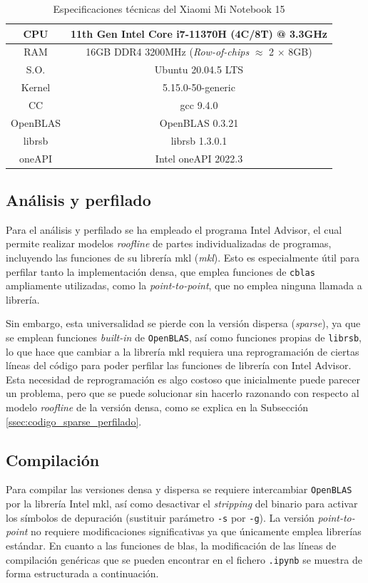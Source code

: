 \begin{table}[htpb]
\centering
\begin{tabular}{|c|c|}
    \hline
    CPU & 11th Gen Intel Core i7-11370H (4C/8T) @ 3.3GHz\\\hline
    RAM & 16GB DDR4 3200MHz (\textit{Row-of-chips} {\small$\approx$} 2 $\times$ 8GB)\\\hline
    S.O. & Ubuntu 20.04.5 LTS\\\hline
    Kernel & 5.15.0-50-generic \\\hline
    CC & gcc 9.4.0\\\hline
    OpenBLAS & OpenBLAS 0.3.21\\\hline
    librsb & librsb 1.3.0.1\\\hline
    oneAPI & Intel oneAPI 2022.3\\\hline
\end{tabular}
\caption{\label{tb:especificaciones_xiaomi}Especificaciones técnicas del Xiaomi Mi Notebook 15}
\end{table}

\subsection{Análisis y perfilado}
\label{ssec:analisis_perfilado_metodologia}
Para el análisis y perfilado se ha empleado el programa Intel Advisor, el cual permite realizar modelos \textit{roofline} de partes individualizadas de programas, incluyendo las funciones de su librería \acrshort{mkl} (\textit{\acrlong{mkl}}). Esto es especialmente útil para perfilar tanto la implementación densa, que emplea funciones de \texttt{cblas} ampliamente utilizadas, como la \textit{point-to-point}, que no emplea ninguna llamada a librería.

Sin embargo, esta universalidad se pierde con la versión dispersa (\textit{sparse}), ya que se emplean funciones \textit{built-in} de \texttt{OpenBLAS}, así como funciones propias de \texttt{librsb}, lo que hace que cambiar a la librería \acrshort{mkl} requiera una reprogramación de ciertas líneas del código para poder perfilar las funciones de librería con Intel Advisor. Esta necesidad de reprogramación es algo costoso que inicialmente puede parecer un problema, pero que se puede solucionar sin hacerlo razonando con respecto al modelo \textit{roofline} de la versión densa, como se explica en la Subsección \ref{ssec:codigo_sparse_perfilado}.

\subsection{Compilación}
\label{ssec:compilacion_metodologia}
Para compilar las versiones densa y dispersa se requiere intercambiar \texttt{OpenBLAS} por la librería Intel \acrshort{mkl}, así como desactivar el \textit{stripping} del binario para activar los símbolos de depuración (sustituir parámetro \texttt{-s} por \texttt{-g}). La versión \textit{point-to-point} no requiere modificaciones significativas ya que únicamente emplea librerías estándar. En cuanto a las funciones de \acrshort{blas}, la modificación de las líneas de compilación genéricas que se pueden encontrar en el fichero \texttt{.ipynb} se muestra de forma estructurada a continuación.

